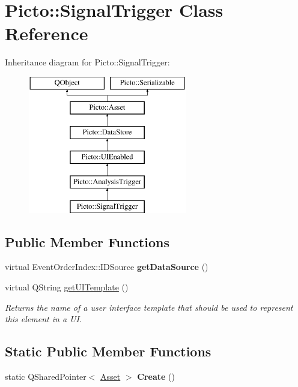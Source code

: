 \hypertarget{class_picto_1_1_signal_trigger}{\section{Picto\-:\-:Signal\-Trigger Class Reference}
\label{class_picto_1_1_signal_trigger}
}
Inheritance diagram for Picto\-:\-:Signal\-Trigger\-:\begin{figure}[H]
\begin{center}
\leavevmode
\includegraphics[height=6.000000cm]{class_picto_1_1_signal_trigger}
\end{center}
\end{figure}
\subsection*{Public Member Functions}
\begin{DoxyCompactItemize}
\item 
\hypertarget{class_picto_1_1_signal_trigger_a3070c87e85b9871d00db4e20354c651c}{virtual Event\-Order\-Index\-::\-I\-D\-Source {\bfseries get\-Data\-Source} ()}\label{class_picto_1_1_signal_trigger_a3070c87e85b9871d00db4e20354c651c}

\item 
\hypertarget{class_picto_1_1_signal_trigger_ad3d93979c06a244bc8fe4e011fea8e90}{virtual Q\-String \hyperlink{class_picto_1_1_signal_trigger_ad3d93979c06a244bc8fe4e011fea8e90}{get\-U\-I\-Template} ()}\label{class_picto_1_1_signal_trigger_ad3d93979c06a244bc8fe4e011fea8e90}

\begin{DoxyCompactList}\small\item\em Returns the name of a user interface template that should be used to represent this element in a U\-I. \end{DoxyCompactList}\end{DoxyCompactItemize}
\subsection*{Static Public Member Functions}
\begin{DoxyCompactItemize}
\item 
\hypertarget{class_picto_1_1_signal_trigger_a0dbcfcf254992115c9c76ade8ba4eca1}{static Q\-Shared\-Pointer$<$ \hyperlink{class_picto_1_1_asset}{Asset} $>$ {\bfseries Create} ()}\label{class_picto_1_1_signal_trigger_a0dbcfcf254992115c9c76ade8ba4eca1}

\end{DoxyCompactItemize}
